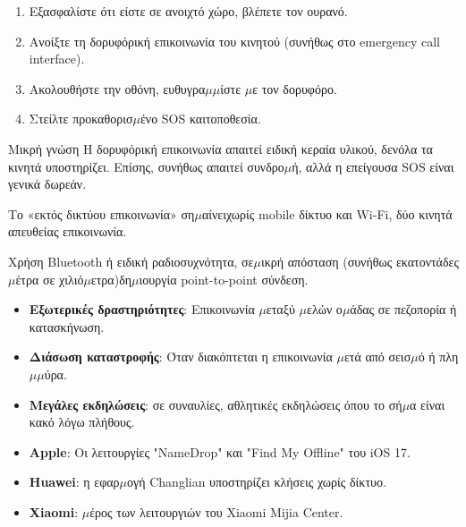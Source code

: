 
\begin{enumerate}
  \item Εξασφαλίστε ότι είστε σε ανοιχτό χώρο, βλέπετε τον ουρανό.
  \item Ανοίξτε τη δορυφόρική επικοινωνία του κινητού (συνήθως στο emergency call interface).
  \item Ακολουθήστε την οθόνη, ευθυγρα$\mu$$\mu$ίστε $\mu$ε τον δορυφόρο.
  \item Στείλτε προκαθορισ$\mu$ένο SOS καιτοποθεσία.
\end{enumerate}

\begin{tcbinfo}{Μικρή γνώση}
Η δορυφόρική επικοινωνία απαιτεί ειδική κεραία υλικού, δενόλα τα κινητά υποστηρίζει. Επίσης, συνήθως απαιτεί συνδρο$\mu$ή, αλλά η επείγουσα SOS είναι γενικά δωρεάν.

\end{tcbinfo}


Το «εκτός δικτύου επικοινωνία» ση$\mu$αίνειχωρίς mobile δίκτυο και Wi-Fi, δύο κινητά απευθείας επικοινωνία.


Χρήση Bluetooth ή ειδική ραδιοσυχνότητα, σε$\mu$ικρή απόσταση (συνήθως εκατοντάδες $\mu$έτρα σε χιλιό$\mu$ετρα)δη$\mu$ιουργία point-to-point σύνδεση.


\begin{itemize}
  \item \textbf{Εξωτερικές δραστηριότητες}: Επικοινωνία $\mu$εταξύ $\mu$ελών ο$\mu$άδας σε πεζοπορία ή κατασκήνωση.
  \item \textbf{Διάσωση καταστροφής}: Όταν διακόπτεται η επικοινωνία $\mu$ετά από σεισ$\mu$ό ή πλη$\mu$$\mu$ύρα.
  \item \textbf{Μεγάλες εκδηλώσεις}: σε συναυλίες, αθλητικές εκδηλώσεις όπου το σή$\mu$α είναι κακό λόγω πλήθους.
\end{itemize}


\begin{itemize}
  \item \textbf{Apple}: Οι λειτουργίες "NameDrop" και "Find My Offline" του iOS 17.
  \item \textbf{Huawei}: η εφαρ$\mu$ογή Changlian υποστηρίζει κλήσεις χωρίς δίκτυο.
  \item \textbf{Xiaomi}: $\mu$έρος των λειτουργιών του Xiaomi Mijia Center.
\end{itemize}

